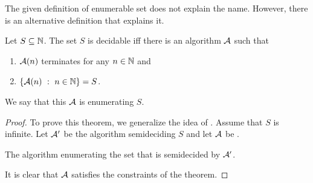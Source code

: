 The given definition of enumerable set does not explain the name. However,
there is an alternative definition that explains it.
\begin{theorem}
\label{theorem:enumerable-semidecidable}
  Let $S \subseteq {\mathbb{N}}$. The set $S$ is decidable iff there is an algorithm
  $\mathcal{A}$ such that
  \begin{enumerate}
    \item $\mathcal{A}(n)$ terminates for any $n \in {\mathbb{N}}$ and
    \item $\set[n \in  \N]{\Algorithm{A}(n)} = S$.
  \end{enumerate}

  We say that this $\mathcal{A}$ is enumerating $S$.
\end{theorem}
\begin{proof}
  To prove this theorem, we generalize the idea of
  . Assume that $S$ is infinite.
  Let $\mathcal{A}'$ be the algorithm semideciding $S$ and
  let $\mathcal{A}$ be .
  \begin{algorithm}
      \begin{algorithmic}[1]
                \Parallel
                \EndParallel
              \EndWhile
          \EndFunction
      \end{algorithmic}
      \caption{The algorithm enumerating the set that is semidecided by
        $\mathcal{A}'$.}
      \label{algorithm:enumerating-from-semideciding}
  \end{algorithm}
  It is clear that $\mathcal{A}$ satisfies the constraints of the theorem.


\end{proof}
